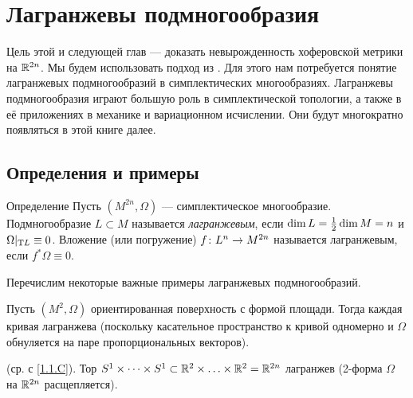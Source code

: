 \chapter{Лагранжевы подмногообразия}\label{chap:3}

Цель этой и следующей глав — доказать невырожденность хоферовской метрики на $\mathbb{R}^{2n}$.
Мы будем использовать подход из \cite{P1}.
Для этого нам потребуется понятие лагранжевых подмногообразий в симплектических многообразиях.
Лагранжевы подмногообразия играют большую роль в симплектической топологии, а также в её приложениях в механике и вариационном исчислении.
Они будут многократно появляться в этой книге далее.

\section{Определения и примеры}\label{3.1}

\begin{ex*}{Определение}
Пусть $(M^{2n}, \Omega)$ — симплектическое многообразие.
Подмногообразие $L \subset M$ называется \emph{лагранжевым}, если $\dim L \z= \tfrac12 \dim M = n$ и $\Omega|_{\mathrm{T} L} \equiv 0$.
Вложение (или погружение) $f\colon L^n \z\to M^{2n}$ называется лагранжевым, если $f^\ast \Omega \equiv 0$.
\end{ex*}

Перечислим некоторые важные примеры лагранжевых подмногообразий.

\begin{ex}{}\label{3.1.A} 
Пусть $(M^2, \Omega)$ ориентированная поверхность с формой площади.
Тогда каждая кривая лагранжева (поскольку касательное пространство к кривой одномерно и $\Omega$ обнуляется на паре пропорциональных векторов).
\end{ex}


\begin{ex}{}\label{3.1.B} (ср. с \ref{1.1.C}).
Тор $S^1 \times\dots\times S^1
\z\subset 
\RR^2\times\z\dots\times \RR^2 
= 
\RR^{2n}$ лагранжев (2-форма $\Omega$ на $\mathbb{R}^{2n}$ расщепляется).
\end{ex}


